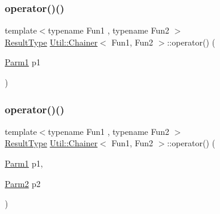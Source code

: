 \subsubsection{\texorpdfstring{operator()()}{operator()()}\hspace{0.1cm}{\footnotesize\ttfamily [6/18]}}
{\footnotesize\ttfamily template$<$typename Fun1 , typename Fun2 $>$ \\
\mbox{\hyperlink{classUtil_1_1Chainer_a2c8d88a77b8ba93eb915dc799ddafbb9}{Result\+Type}} \mbox{\hyperlink{classUtil_1_1Chainer}{Util\+::\+Chainer}}$<$ Fun1, Fun2 $>$\+::operator() (\begin{DoxyParamCaption}\item[{\mbox{\hyperlink{classUtil_1_1Chainer_a3e09b2267dabdd8d12070b09c47749c6}{Parm1}}}]{p1 }\end{DoxyParamCaption})\hspace{0.3cm}{\ttfamily [inline]}}

\mbox{\label{classUtil_1_1Chainer_af5e43ed56a289b68e7704727ef552208}} 
\subsubsection{\texorpdfstring{operator()()}{operator()()}\hspace{0.1cm}{\footnotesize\ttfamily [7/18]}}
{\footnotesize\ttfamily template$<$typename Fun1 , typename Fun2 $>$ \\
\mbox{\hyperlink{classUtil_1_1Chainer_a2c8d88a77b8ba93eb915dc799ddafbb9}{Result\+Type}} \mbox{\hyperlink{classUtil_1_1Chainer}{Util\+::\+Chainer}}$<$ Fun1, Fun2 $>$\+::operator() (\begin{DoxyParamCaption}\item[{\mbox{\hyperlink{classUtil_1_1Chainer_a3e09b2267dabdd8d12070b09c47749c6}{Parm1}}}]{p1,  }\item[{\mbox{\hyperlink{classUtil_1_1Chainer_a1bfb0e8f35679278c85d232a74a107ff}{Parm2}}}]{p2 }\end{DoxyParamCaption})\hspace{0.3cm}{\ttfamily [inline]}}

\mbox{\label{classUtil_1_1Chainer_af5e43ed56a289b68e7704727ef552208}} 
